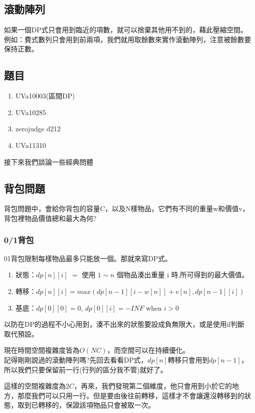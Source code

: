 \subsection{滾動陣列}
如果一個DP式只會用到臨近的項數，就可以捨棄其他用不到的，藉此壓縮空間。
例如：費式數列只會用到前兩項，我們就用取餘數來實作滾動陣列，注意被餘數要保持正數。

\subsection{題目}
\begin{enumerate}
\item UVa10003(區間DP)
\item UVa10285
\item zerojudge d212
\item UVa11310
\end{enumerate}
接下來我們談論一些經典問體
\subsection{背包問題}
背包問題中，會給你背包的容量C，以及N樣物品，它們有不同的重量w和價值v，背包裡物品價值總和最大為何?
\subsubsection{0/1背包}
01背包限制每樣物品最多只能放一個。那就來寫DP式。
\begin{enumerate}
\item 狀態：$dp[n][i]$ $=$ 使用 $1 ∼ n$ 個物品湊出重量 i 時,所可得到的最大價值。
\item 轉移：$dp[n][i] = max(dp[n − 1][i − w[n]] + v[n], dp[n − 1][i])$
\item 基底：$dp[0][0] = 0$, $dp[0][i] = −INF$ when $i>0$
\end{enumerate}
以防在DP的過程不小心用到，湊不出來的狀態要設成負無限大，或是使用if判斷取代預設。

現在時間空間複雜度皆為$O(NC)$，而空間可以在持續優化。\\
記得剛剛說過的滾動陣列嗎?先回去看看DP式，$dp[n]$轉移只會用到$dp[n-1]$，所以我們只要保留前一行(行列的區分我不管)就好了。

這樣的空間複雜度為$2C$，再來，我們發現第二個維度，他只會用到小於它的地方，那麼我們可以只用一行。但是要由後往前轉移，這樣才不會讓還沒轉移到的狀態，取到已轉移的，保證該項物品只會被取一次。

